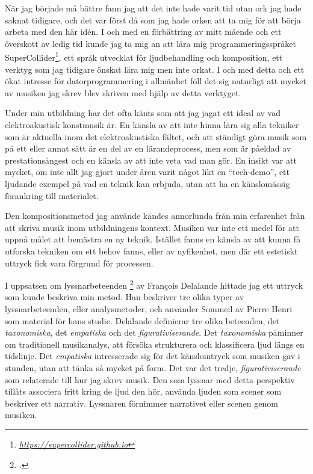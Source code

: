 \documentclass{article}
\begin{document}
När jag började må bättre fann jag att det inte hade varit tid utan ork jag hade saknat tidigare, och det var
först då som jag hade orken att ta mig för att börja arbeta med den här idén. I och med en förbättring av
mitt mående och ett överskott av ledig tid kunde jag ta mig an att lära mig programmeringsspråket 
SuperCollider\footnote{\emph{\url{https://supercollider.github.io}}}, ett språk utvecklat för ljudbehandling och
komposition, ett verktyg som jag tidigare önskat lära mig men inte orkat. I och med detta och ett ökat
intresse för datorprogrammering i allmänhet föll det sig naturligt att mycket av musiken jag skrev blev
skriven med hjälp av detta verktyget.

Under min utbildning har det ofta känts som att jag jagat ett ideal av vad elektroakustisk konstmusik är. En
känsla av att inte hinna lära sig alla tekniker som är aktuella inom det elektroakustiska fältet, och att
ständigt göra musik som på ett eller annat sätt är en del av en lärandeprocess, men som är påeldad av
prestationsångest och en känsla av att inte veta vad man gör. En insikt var att mycket, om inte allt jag gjort
under åren varit något likt en ``tech-demo'', ett ljudande exempel på vad en teknik kan erbjuda, utan att ha en
känslomässig förankring till materialet.

Den kompositionsmetod jag använde kändes annorlunda från min erfarenhet från att skriva musik inom
utbildningens kontext. Musiken var inte ett medel för att uppnå målet att bemästra en ny teknik. Istället
fanns en känsla av att kunna få utforska tekniken om ett behov fanns, eller av nyfikenhet, men där ett
estetiskt uttryck fick vara förgrund för processen. 

I uppsatsen om lyssnarbeteenden \footcite{Delalande1998} av François Delalande hittade jag ett uttryck som
kunde beskriva min metod. Han beskriver tre olika typer av lyssnarbeteenden, eller analysmetoder, och använder
Sommeil av Pierre Henri som material för hans studie. Delalande definierar tre olika beteenden, det
\emph{taxonomiska}, det \emph{empatiska} och det \emph{figurativiserande}. Det \emph{taxonomiska} påminner om
traditionell musikanalys, att försöka strukturera och klassificera ljud längs en tidslinje. Det
\emph{empatiska} intresserade sig för det känslointryck som musiken gav i stunden, utan att tänka så mycket på
form. Det var det tredje, \emph{figurativiserande} som relaterade till hur jag skrev musik. Den som lyssnar
med detta perspektiv tillåts associera fritt kring de ljud den hör, använda ljuden som scener som beskriver
ett narrativ. Lyssnaren förnimmer narrativet eller scenen genom musiken. 
\end{document}
